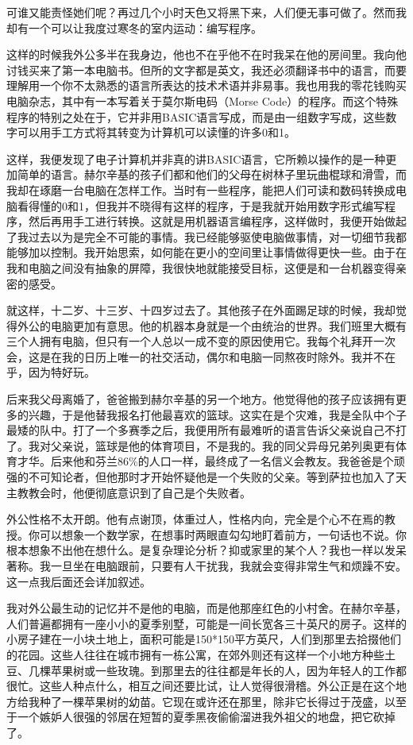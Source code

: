 \documentclass[12pt,UTF8]{ctexbook}
\begin{document}
可谁又能责怪她们呢？再过几个小时天色又将黑下来，人们便无事可做了。然而我却有一个可以让我度过寒冬的室内运动：编写程序。

这样的时候我外公多半在我身边，他也不在乎他不在时我呆在他的房间里。我向他讨钱买来了第一本电脑书。但所的文字都是英文，我还必须翻译书中的语言，而要理解用一个你不太熟悉的语言所表达的技术术语并非易事。我也用我的零花钱购买电脑杂志，其中有一本写着关于莫尔斯电码（Morse Code）的程序。而这个特殊程序的特别之处在于，它并非用BASIC语言写成，而是由一组数字写成，这些数字可以用手工方式将其转变为计算机可以读懂的许多0和1。

这样，我便发现了电子计算机并非真的讲BASIC语言，它所赖以操作的是一种更加简单的语言。赫尔辛基的孩子们都和他们的父母在树林子里玩曲棍球和滑雪，而我却在琢磨一台电脑在怎样工作。当时有一些程序，能把人们可读和数码转换成电脑看得懂的0和1，但我并不晓得有这样的程序，于是我就开始用数字形式编写程序，然后再用手工进行转换。这就是用机器语言编程序，这样做时，我便开始做起了我过去以为是完全不可能的事情。我已经能够驱使电脑做事情，对一切细节我都能够加以控制。我开始思索，如何能在更小的空间里让事情做得更快一些。由于在我和电脑之间没有抽象的屏障，我很快地就能接受目标，这便是和一台机器变得亲密的感受。

就这样，十二岁、十三岁、十四岁过去了。其他孩子在外面踢足球的时候，我却觉得外公的电脑更加有意思。他的机器本身就是一个由统治的世界。我们班里大概有三个人拥有电脑，但只有一个人总以一成不变的原因使用它。我每个礼拜开一次会，这是在我的日历上唯一的社交活动，偶尔和电脑一同熬夜时除外。我并不在乎，因为特好玩。

后来我父母离婚了，爸爸搬到赫尔辛基的另一个地方。他觉得他的孩子应该拥有更多的兴趣，于是他替我报名打他最喜欢的篮球。这实在是个灾难，我是全队中个子最矮的队中。打了一个多赛季之后，我便用所有最难听的语言告诉父亲说自己不打了。我对父亲说，篮球是他的体育项目，不是我的。我的同父异母兄弟列奥更有体育才华。后来他和芬兰86\%的人口一样，最终成了一名信义会教友。我爸爸是个顽强的不可知论者，但他那时才开始怀疑他是一个失败的父亲。等到萨拉也加入了天主教教会时，他便彻底意识到了自己是个失败者。

外公性格不太开朗。他有点谢顶，体重过人，性格内向，完全是个心不在焉的教授。你可以想象一个数学家，在想事时两眼直勾勾地盯着前方，一句话也不说。你根本想象不出他在想什么。是复杂理论分析？抑或家里的某个人？我也一样以发呆著称。我一旦坐在电脑跟前，只要有人干扰我，我就会变得非常生气和烦躁不安。这一点我后面还会详加叙述。

我对外公最生动的记忆并不是他的电脑，而是他那座红色的小村舍。在赫尔辛基，人们普遍都拥有一座小小的夏季别墅，可能是一间长宽各三十英尺的房子。这样的小房子建在一小块土地上，面积可能是150*150平方英尺，人们到那里去拾掇他们的花园。这些人往往在城市拥有一栋公寓，在郊外则还有这样一个小地方种些土豆、几棵苹果树或一些玫瑰。到那里去的往往都是年长的人，因为年轻人的工作都很忙。这些人种点什么，相互之间还要比试，让人觉得很滑稽。外公正是在这个地方给我种了一棵苹果树的幼苗。它现在或许还在那里，除非它长得过于茂盛，以至于一个嫉妒人很强的邻居在短暂的夏季黑夜偷偷溜进我外祖父的地盘，把它砍掉了。
\end{document}
